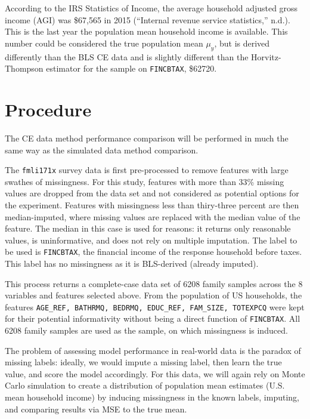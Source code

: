 \documentclass[12pt,twoside]{reedthesis}
\begin{document}
According to the IRS Statistics of Income, the average household
adjusted gross income (AGI) was \$67,565 in 2015 (``Internal revenue
service statistics,'' n.d.). This is the last year the population mean
household income is available. This number could be considered the true
population mean \(\mu_y\), but is derived differently than the BLS CE
data and is slightly different than the Horvitz-Thompson estimator for
the sample on \texttt{FINCBTAX}, \$62720.

\section{Procedure}\label{procedure}

The CE data method performance comparison will be performed in much the
same way as the simulated data method comparison.

The \texttt{fmli171x} survey data is first pre-processed to remove
features with large swathes of missingness. For this study, features
with more than 33\% missing values are dropped from the data set and not
considered as potential options for the experiment. Features with
missingness less than thiry-three percent are then median-imputed, where
missing values are replaced with the median value of the feature. The
median in this case is used for reasons: it returns only reasonable
values, is uninformative, and does not rely on multiple imputation. The
label to be used is \texttt{FINCBTAX}, the financial income of the
response household before taxes. This label has no missingness as it is
BLS-derived (already imputed).

This process returns a complete-case data set of 6208 family samples
across the 8 variables and features selected above. From the population
of US households, the features
\texttt{AGE\_REF,\ BATHRMQ,\ BEDRMQ,\ EDUC\_REF,\ FAM\_SIZE,\ TOTEXPCQ}
were kept for their potential informativity without being a direct
function of \texttt{FINCBTAX}. All 6208 family samples are used as the
sample, on which missingness is induced.

The problem of assessing model performance in real-world data is the
paradox of missing labels: ideally, we would impute a missing label,
then learn the true value, and score the model accordingly. For this
data, we will again rely on Monte Carlo simulation to create a
distribution of population mean estimates (U.S. mean household income)
by inducing missingness in the known labels, imputing, and comparing
results via MSE to the true mean.
\end{document}
